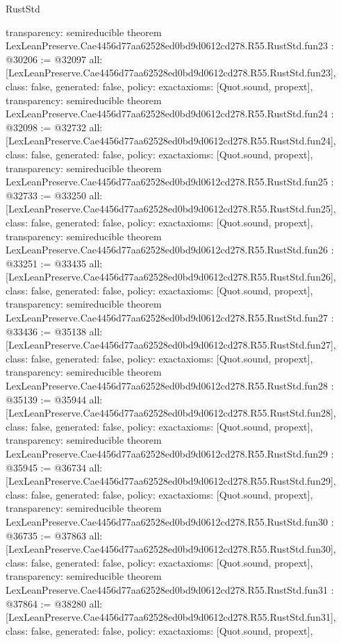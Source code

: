 \begin{lexlean}{RustStd}
\begin{coremodule}
{  transparency: semireducible
}
theorem LexLeanPreserve.Cae4456d77aa62528ed0bd9d0612cd278.R55.RustStd.fun23 : @30206 := @32097 {
  all: [LexLeanPreserve.Cae4456d77aa62528ed0bd9d0612cd278.R55.RustStd.fun23],
  class: false,
  generated: false,
  policy: exact{axioms: [Quot.sound, propext]},
  transparency: semireducible
}
theorem LexLeanPreserve.Cae4456d77aa62528ed0bd9d0612cd278.R55.RustStd.fun24 : @32098 := @32732 {
  all: [LexLeanPreserve.Cae4456d77aa62528ed0bd9d0612cd278.R55.RustStd.fun24],
  class: false,
  generated: false,
  policy: exact{axioms: [Quot.sound, propext]},
  transparency: semireducible
}
theorem LexLeanPreserve.Cae4456d77aa62528ed0bd9d0612cd278.R55.RustStd.fun25 : @32733 := @33250 {
  all: [LexLeanPreserve.Cae4456d77aa62528ed0bd9d0612cd278.R55.RustStd.fun25],
  class: false,
  generated: false,
  policy: exact{axioms: [Quot.sound, propext]},
  transparency: semireducible
}
theorem LexLeanPreserve.Cae4456d77aa62528ed0bd9d0612cd278.R55.RustStd.fun26 : @33251 := @33435 {
  all: [LexLeanPreserve.Cae4456d77aa62528ed0bd9d0612cd278.R55.RustStd.fun26],
  class: false,
  generated: false,
  policy: exact{axioms: [Quot.sound, propext]},
  transparency: semireducible
}
theorem LexLeanPreserve.Cae4456d77aa62528ed0bd9d0612cd278.R55.RustStd.fun27 : @33436 := @35138 {
  all: [LexLeanPreserve.Cae4456d77aa62528ed0bd9d0612cd278.R55.RustStd.fun27],
  class: false,
  generated: false,
  policy: exact{axioms: [Quot.sound, propext]},
  transparency: semireducible
}
theorem LexLeanPreserve.Cae4456d77aa62528ed0bd9d0612cd278.R55.RustStd.fun28 : @35139 := @35944 {
  all: [LexLeanPreserve.Cae4456d77aa62528ed0bd9d0612cd278.R55.RustStd.fun28],
  class: false,
  generated: false,
  policy: exact{axioms: [Quot.sound, propext]},
  transparency: semireducible
}
theorem LexLeanPreserve.Cae4456d77aa62528ed0bd9d0612cd278.R55.RustStd.fun29 : @35945 := @36734 {
  all: [LexLeanPreserve.Cae4456d77aa62528ed0bd9d0612cd278.R55.RustStd.fun29],
  class: false,
  generated: false,
  policy: exact{axioms: [Quot.sound, propext]},
  transparency: semireducible
}
theorem LexLeanPreserve.Cae4456d77aa62528ed0bd9d0612cd278.R55.RustStd.fun30 : @36735 := @37863 {
  all: [LexLeanPreserve.Cae4456d77aa62528ed0bd9d0612cd278.R55.RustStd.fun30],
  class: false,
  generated: false,
  policy: exact{axioms: [Quot.sound, propext]},
  transparency: semireducible
}
theorem LexLeanPreserve.Cae4456d77aa62528ed0bd9d0612cd278.R55.RustStd.fun31 : @37864 := @38280 {
  all: [LexLeanPreserve.Cae4456d77aa62528ed0bd9d0612cd278.R55.RustStd.fun31],
  class: false,
  generated: false,
  policy: exact{axioms: [Quot.sound, propext]},
}
\end{coremodule}
\end{lexlean}
